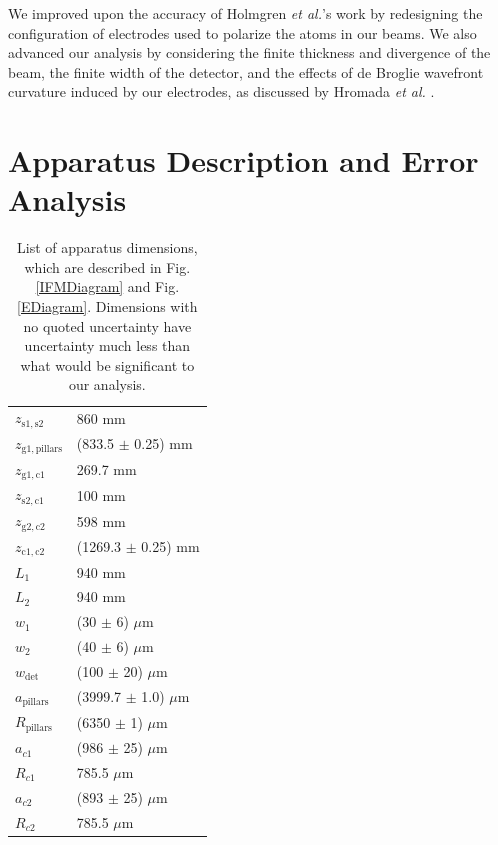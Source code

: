\documentclass[twocolumn,prl,showpacs,superscriptaddress]{revtex4-1}   %
\newcommand{\figref}[1]{Fig. \ref{#1}}
\newcommand{\etal}{\textit{et al.}}
\newcommand{\etalspace}{\textit{et al. }}
\begin{document}
We improved upon the accuracy of Holmgren \etal's work by redesigning the configuration of electrodes used to polarize the atoms in our beams. We also advanced our analysis by considering the finite thickness and divergence of the beam, the finite width of the detector, and the effects of de Broglie wavefront curvature induced by our electrodes, as discussed by Hromada \etalspace \cite{Hromada2014}.


\section{Apparatus Description and Error Analysis}

\begingroup
\begin{table}
\caption{\label{tableDimensions}List of apparatus dimensions, which are described in \figref{IFMDiagram} and \figref{EDiagram}. Dimensions with no quoted uncertainty have uncertainty much less than what would be significant to our analysis.}
\begin{center}
\begin{tabular}{l l}
\hline\hline
$z_{\mathrm{s1,s2}}$ & 860 mm \\
$z_{\mathrm{g1,pillars}}$ & (833.5 $\pm$ 0.25) mm \\
$z_{\mathrm{g1,c1}}$ & 269.7 mm \\
$z_{\mathrm{s2,c1}}$ & 100 mm \\
$z_{\mathrm{g2,c2}}$ & 598 mm \\
$z_{\mathrm{c1,c2}}$ & (1269.3 $\pm$ 0.25) mm \\
$L_1$ & 940 mm \\
$L_2$ & 940 mm \\
$w_1$ & (30 $\pm$ 6) $\mu$m \\
$w_2$ & (40 $\pm$ 6) $\mu$m \\
$w_{\mathrm{det}}$ & (100 $\pm$ 20) $\mu$m \\ 
$a_{\mathrm{pillars}}$ & (3999.7 $\pm$ 1.0) $\mu$m \\
$R_{\mathrm{pillars}}$ & (6350 $\pm$ 1) $\mu$m \\
$a_{c1}$ & (986 $\pm$ 25) $\mu$m \\
$R_{c1}$ & 785.5 $\mu$m \\
$a_{c2}$ & (893 $\pm$ 25) $\mu$m \\
$R_{c2}$ & 785.5 $\mu$m \\
\hline\hline
\end{tabular}
\end{center}
\end{table}
\endgroup
\end{document}
